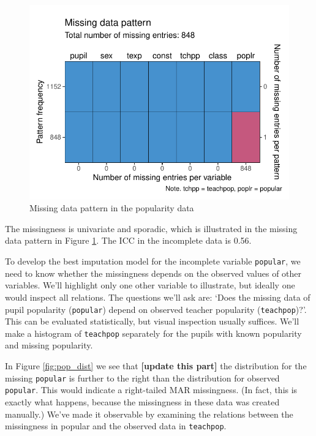 \documentclass[
]{jss}
\begin{document}
\begin{CodeChunk}
\begin{figure}

{\centering \includegraphics{Manuscript_files/figure-latex/pop_pat-1} 

}

\caption[Missing data pattern in the popularity data]{Missing data pattern in the popularity data}\label{fig:pop_pat}
\end{figure}
\end{CodeChunk}

The missingness is univariate and sporadic, which is illustrated in the
missing data pattern in Figure \ref{fig:pop_pat}. The ICC in the
incomplete data is 0.56.

To develop the best imputation model for the incomplete variable
\texttt{popular}, we need to know whether the missingness depends on the
observed values of other variables. We'll highlight only one other
variable to illustrate, but ideally one would inspect all relations. The
questions we'll ask are: `Does the missing data of pupil popularity
(\texttt{popular}) depend on observed teacher popularity
(\texttt{teachpop})?'. This can be evaluated statistically, but visual
inspection usually suffices. We'll make a histogram of \texttt{teachpop}
separately for the pupils with known popularity and missing popularity.

In Figure \ref{fig:pop_dist} we see that \textbf{{[}update this part{]}}
the distribution for the missing \texttt{popular} is further to the
right than the distribution for observed \texttt{popular}. This would
indicate a right-tailed MAR missingness. (In fact, this is exactly what
happens, because the missingness in these data was created manually.)
We've made it observable by examining the relations between the
missingness in popular and the observed data in \texttt{teachpop}.
\end{document}

